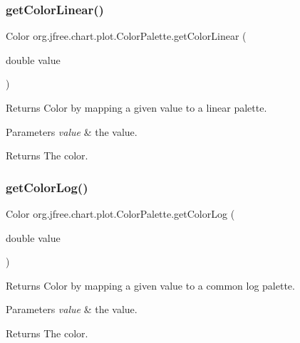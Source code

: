 \subsubsection{\texorpdfstring{get\+Color\+Linear()}{getColorLinear()}}
{\footnotesize\ttfamily Color org.\+jfree.\+chart.\+plot.\+Color\+Palette.\+get\+Color\+Linear (\begin{DoxyParamCaption}\item[{double}]{value }\end{DoxyParamCaption})}

Returns Color by mapping a given value to a linear palette.


\begin{DoxyParams}{Parameters}
{\em value} & the value.\\
\hline
\end{DoxyParams}
\begin{DoxyReturn}{Returns}
The color. 
\end{DoxyReturn}
\mbox{\label{classorg_1_1jfree_1_1chart_1_1plot_1_1_color_palette_a98fd609fb10d838212f14a6d042c951f}} 
\subsubsection{\texorpdfstring{get\+Color\+Log()}{getColorLog()}}
{\footnotesize\ttfamily Color org.\+jfree.\+chart.\+plot.\+Color\+Palette.\+get\+Color\+Log (\begin{DoxyParamCaption}\item[{double}]{value }\end{DoxyParamCaption})}

Returns Color by mapping a given value to a common log palette.


\begin{DoxyParams}{Parameters}
{\em value} & the value.\\
\hline
\end{DoxyParams}
\begin{DoxyReturn}{Returns}
The color. 
\end{DoxyReturn}
\mbox{\label{classorg_1_1jfree_1_1chart_1_1plot_1_1_color_palette_aa740b4cd9a115ff7bdefdaa74521c6de}} 
